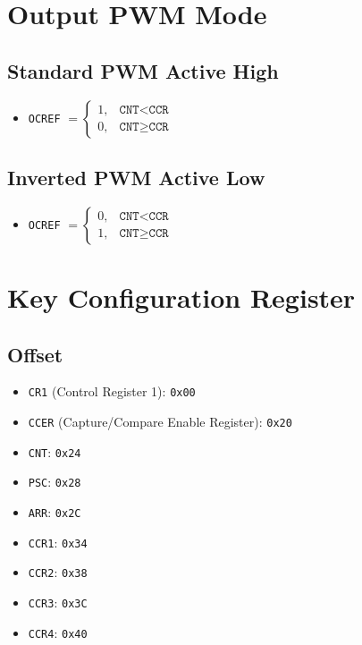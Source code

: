 \documentclass[a4paper,12pt,openany]{book}
\begin{document}
\section{Output PWM Mode}
\subsection{Standard PWM Active High}
\begin{itemize}
    \item \texttt{OCREF} $=\begin{cases}
        1,&\texttt{CNT}<\texttt{CCR}\\
        0,&\texttt{CNT}\geqslant\texttt{CCR}
    \end{cases}$
\end{itemize}
\subsection{Inverted PWM Active Low}
\begin{itemize}
    \item \texttt{OCREF} $=\begin{cases}
        0,&\texttt{CNT}<\texttt{CCR}\\
        1,&\texttt{CNT}\geqslant\texttt{CCR}
    \end{cases}$
\end{itemize}
\section{Key Configuration Register}
\subsection{Offset}
\begin{itemize}
    \item \texttt{CR1} (Control Register 1): \texttt{0x00}
    \item \texttt{CCER} (Capture/Compare Enable Register): \texttt{0x20}
    \item \texttt{CNT}: \texttt{0x24}
    \item \texttt{PSC}: \texttt{0x28}
    \item \texttt{ARR}: \texttt{0x2C}
    \item \texttt{CCR1}: \texttt{0x34}
    \item \texttt{CCR2}: \texttt{0x38}
    \item \texttt{CCR3}: \texttt{0x3C}
    \item \texttt{CCR4}: \texttt{0x40}
\end{itemize}
\end{document}
